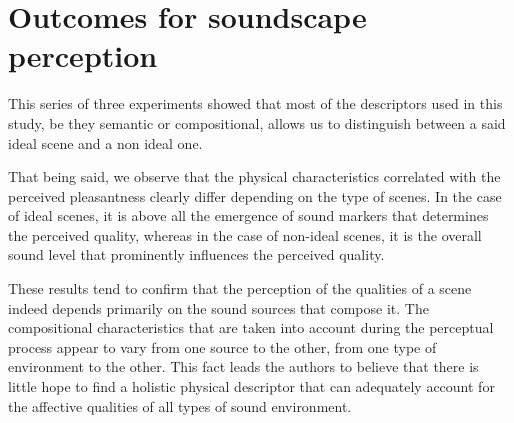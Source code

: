 \documentclass[preprint,12pt]{elsarticle}
\begin{document}
\section{Outcomes for soundscape perception}
\label{sec:conclusion}

This series of three experiments showed that most of the descriptors used in this study, be they semantic or compositional, allows us to distinguish between a said ideal scene and a non ideal one.


That being said, we observe that the physical characteristics correlated with the perceived pleasantness clearly differ depending on the type of scenes. In the case of ideal scenes, it is above all the emergence of sound markers that determines the perceived quality, whereas in the case of non-ideal scenes, it is the overall sound level that prominently influences the perceived quality.


These results tend to confirm that the perception of the qualities of a scene indeed depends primarily on the sound sources that compose it. The compositional characteristics that are taken into account during the perceptual process appear to vary from one source to the other, from one type of environment to the other. This fact leads the authors to believe that there is little hope to find a holistic physical descriptor that can adequately account for the affective qualities of all types of sound environment.

\end{document}
